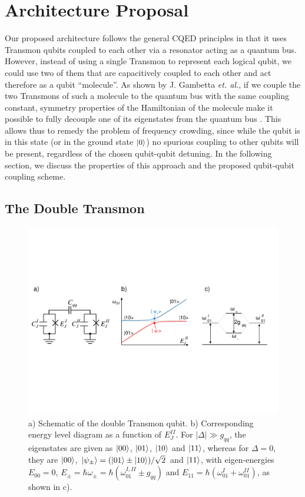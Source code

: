 \section{Architecture Proposal}

Our proposed architecture follows the general CQED principles in that it uses Transmon qubits coupled to each other via a resonator acting as a quantum bus. However, instead of using a single Transmon to represent each logical qubit, we could use two of them that are capacitively coupled to each other and act therefore as a qubit ``molecule''. As shown by J. Gambetta {\it et. al.}, if we couple the two Transmons of such a molecule to the quantum bus with the same coupling constant, symmetry properties of the Hamiltonian of the molecule make it possible to fully decouple one of its eigenstates from the quantum bus \citep{gambetta_superconducting_2011}. This allows thus to remedy the problem of frequency crowding, since while the qubit is in this state (or in the ground state $\left| 0 \right>$) no spurious coupling to other qubits will be present, regardless of the chosen qubit-qubit detuning. In the following section, we discuss the properties of this approach and the proposed qubit-qubit coupling scheme.

\subsection{The Double Transmon} \label{section:double_transmon}

\begin{figure}[ht!]
	\centering
	\includegraphics[width=\textwidth]{./material/figures/scalable-architecture/double_transmon_schematic}
	\caption{a) Schematic of the double Transmon qubit. b) Corresponding energy level diagram as a function of $E_J^{II}$. For $|\Delta|\gg g_{qq}$, the eigenstates are given as $\left| 00 \right>$, $\left| 01 \right>$, $\left| 10 \right>$ and $\left| 11 \right>$, whereas for $\Delta=0$, they are $\left| 00 \right>$, $\left| \psi_\pm \right>=(\left| 01 \right>\pm\left| 10 \right>)/\sqrt{2}$ and $\left| 11 \right>$, with eigen-energies $E_{00}=0$, $E_\pm = \hbar\omega_\pm = \hbar(\omega_{01}^{I,II}\pm g_{qq})$ and $E_{11}=\hbar(\omega_{01}^I+\omega_{01}^{II})$, as shown in c).}
	\label{fig:qubit_molecule_schematic}
\end{figure}

